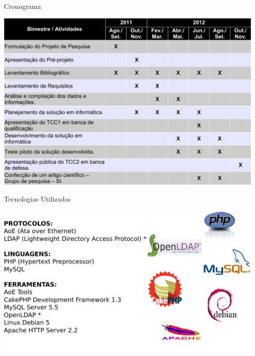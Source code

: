 \documentclass{beamer}
\begin{document}
\begin{frame}{Cronograma}
\begin{center}
\includegraphics[width=\textwidth]{./img/tab-cronograma}
\end{center}
\end{frame}


\begin{frame}{Tecnologias Utilizadas}
\begin{center}
\includegraphics[width=\textwidth]{./work/tecnologias}
\end{center}
\end{frame}
\end{document}
